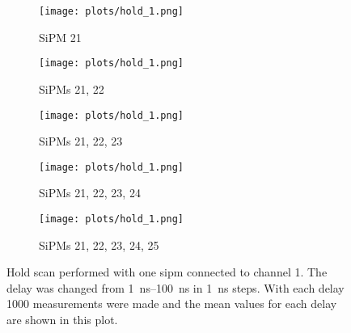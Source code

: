 \begin{figure}
	\centering
	\begin{subfigure}[t]{0.5\textwidth}
		\centering
		\texttt{[image: plots/hold\_1.png]}
		\caption{SiPM 21}
		\label{fig:plot_hold_scan_1}
	\end{subfigure}%
	\begin{subfigure}[t]{0.5\textwidth}
		\centering
		\texttt{[image: plots/hold\_1.png]}
		\caption{SiPMs 21, 22}
		\label{fig:plot_hold_scan_2}
	\end{subfigure}
	\begin{subfigure}[t]{0.5\textwidth}
		\centering
		\texttt{[image: plots/hold\_1.png]}
		\caption{SiPMs 21, 22, 23}
		\label{fig:plot_hold_scan_3}
	\end{subfigure}%
	\begin{subfigure}[t]{0.5\textwidth}
		\centering
		\texttt{[image: plots/hold\_1.png]}
		\caption{SiPMs 21, 22, 23, 24}
		\label{fig:plot_hold_scan_4}
	\end{subfigure}
	\begin{subfigure}[t]{0.5\textwidth}
		\centering
		\texttt{[image: plots/hold\_1.png]}
		\caption{SiPMs 21, 22, 23, 24, 25}
		\label{fig:plot_hold_scan_5}
	\end{subfigure}
	\caption[Hold scan with 1 \ac{sipm} and channel 1]{Hold scan performed with one \ac{sipm} connected to channel 1. The delay was changed from \SIrange{1}{100}{\nano\second} in \SI{1}{\nano\second} steps. With each delay 1000 measurements were made and the mean values for each delay are shown in this plot.}
	\label{fig:plot_hold_scan}
\end{figure}



